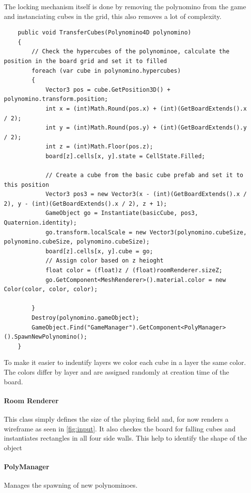 \documentclass{article}
\begin{document}
The locking mechanism itself is done by removing the polynomino from the game and instanciating cubes in the grid, this also removes a lot of complexity.
\begin{verbatim}
    public void TransferCubes(Polynomino4D polynomino)
    {
        // Check the hypercubes of the polynominoe, calculate the position in the board grid and set it to filled
        foreach (var cube in polynomino.hypercubes)
        {
            Vector3 pos = cube.GetPosition3D() + polynomino.transform.position;
            int x = (int)Math.Round(pos.x) + (int)(GetBoardExtends().x / 2);
            int y = (int)Math.Round(pos.y) + (int)(GetBoardExtends().y / 2);
            int z = (int)Math.Floor(pos.z);
            board[z].cells[x, y].state = CellState.Filled;
 
            // Create a cube from the basic cube prefab and set it to this position
            Vector3 pos3 = new Vector3(x - (int)(GetBoardExtends().x / 2), y - (int)(GetBoardExtends().x / 2), z + 1);
            GameObject go = Instantiate(basicCube, pos3, Quaternion.identity);
            go.transform.localScale = new Vector3(polynomino.cubeSize, polynomino.cubeSize, polynomino.cubeSize);
            board[z].cells[x, y].cube = go;
            // Assign color based on z heioght
            float color = (float)z / (float)roomRenderer.sizeZ;
            go.GetComponent<MeshRenderer>().material.color = new Color(color, color, color);
 
        }
        Destroy(polynomino.gameObject);
        GameObject.Find("GameManager").GetComponent<PolyManager>().SpawnNewPolynomino();
    }
\end{verbatim}
To make it easier to indentify layers we color each cube in a layer the same color. The colors differ by layer and are assigned randomly at creation time of the board.


\paragraph{Room Renderer}
This class simply defines the size of the playing field and, for now renders a wireframe as seen in \ref{fig:input}. It also checkes the board for falling cubes and instantiates rectangles in all four side walls. This help to identify the shape of the object 

\paragraph{PolyManager}
Manages the spawning of new polynominoes. 
\end{document}
